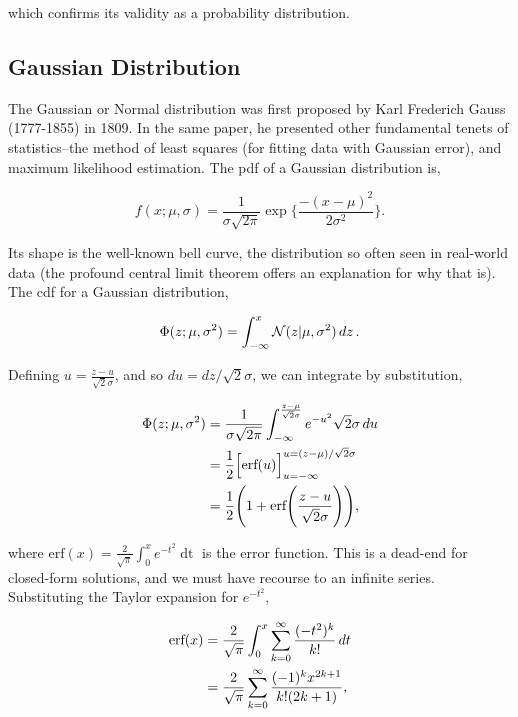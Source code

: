 \documentclass[11pt]{amsart}
\begin{document}
which confirms its validity as a probability distribution.

\subsection{Gaussian Distribution}

The Gaussian or Normal distribution was first proposed by Karl Frederich Gauss (1777-1855) in 1809. In the same paper, he presented other fundamental tenets of statistics--the method of least squares (for fitting data with Gaussian error), and maximum likelihood estimation. The pdf of a Gaussian distribution is,

$$f(x;\mu, \sigma) = \frac{1}{\sigma\sqrt{2\pi}}\exp\Bigg\{\frac{-(x - \mu)^2}{2\sigma^2}\Bigg\}.$$

Its shape is the well-known bell curve, the distribution so often seen in real-world data (the profound central limit theorem offers an explanation for why that is). The cdf for a Gaussian distribution,

$$\Phi({z;\mu,\sigma^2}) = \int_{-\infty}^{x}\mathcal{N}(z | \mu, \sigma^2)\mathop{dz}. \notag$$

Defining $u = \frac{z - u}{\sqrt{2}\sigma}$, and so $du = dz/\sqrt{2}\sigma$, we can integrate by substitution,

\begin{align}
\Phi({z;\mu,\sigma^2}) &= \frac{1}{\sigma\sqrt{2\pi}}\int_{-\infty}^{\frac{z - \mu}{\sqrt{2}\sigma}} e^{-u^2} \sqrt{2}\sigma\mathop{du} \notag \\
&= \frac{1}{2}\Big[\text{erf}(u)\Big]_{u=-\infty}^{u=(z-\mu)/\sqrt{2}\sigma} \notag \\
&= \frac{1}{2}\Bigg(1 + \text{erf}\Bigg(\frac{z - u}{\sqrt{2}\sigma}\Bigg)\Bigg), \notag
\end{align}

where $\text{erf}(x) = \frac{2}{\sqrt{\pi}}\int_{0}^{x}e^{-t^2}\mathop{dt}$ is the error function. This is a dead-end for closed-form solutions, and we must have recourse to an infinite series. Substituting the Taylor expansion for $e^{-t^2}$,

\begin{align}
\text{erf}(x) &= \frac{2}{\sqrt{\pi}}\int_{0}^{x} \sum_{k=0}^{\infty} \frac{(-t^2)^k}{k!} \mathop{dt} \notag \\
&= \frac{2}{\sqrt{\pi}}\sum_{k=0}^{\infty} \frac{(-1)^kx^{2k + 1}}{k!(2k + 1)}, \notag
\end{align}
\end{document}
